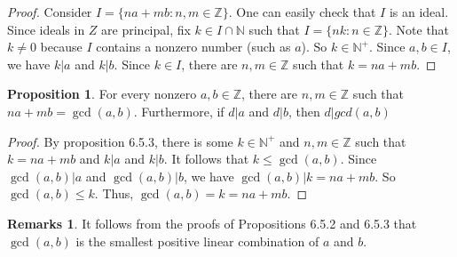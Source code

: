 \documentclass[14pt]{article}
\theoremstyle{definition}
\newtheorem*{remark}{Remarks}
\newtheorem{proposition}[definition]{Proposition}
\begin{document}
\begin{proof}
    Consider $I=\{na+mb\colon n,m \in \mathbb{Z}\}$. One can easily check that $I$ is an ideal. 
    Since ideals in $Z$ are principal, fix $k\in I\cap \mathbb{N}$ such that $I=\{nk:n\in \mathbb{Z}\}$. Note that $k\not= 0 $ because $I$ contains a nonzero  number (such as $a$). So $k\in \mathbb{N}^+$. Since $a,b\in I$, we have $k|a$ and $k|b$. Since $k\in I$, there are $n,m \in\mathbb{Z}$ such that $k=na+mb$.
\end{proof}

\vspace{2mm} %

\begin{proposition}
    For every nonzero $a,b\in \mathbb{Z}$, there are $n,m \in\mathbb{Z}$ such that  $na+mb=\gcd(a,b)$. Furthermore, if $d|a$ and $d|b$, then $d|gcd(a,b)$
\end{proposition}
\begin{proof}
    By proposition 6.5.3,  there is some $ k\in\mathbb{N}^+ $ and $n,m \in\mathbb{Z}$ such that $k=na+mb$ and $k|a$ and $k|b$. It follows that $k\leq \gcd(a,b)$. Since $\gcd(a,b)|a$ and $\gcd(a,b)|b$, we have $\gcd(a,b)| k=na+mb$. So $\gcd(a,b)\leq k$. Thus, $\gcd(a,b)=k=na+mb $.
\end{proof}


\begin{remark}
   It follows from the proofs of Propositions 6.5.2 and 6.5.3 that $\gcd(a,b)$ is the smallest positive linear combination of $a$ and $b$. 
\end{remark}

\vspace{2mm} %
\end{document}

